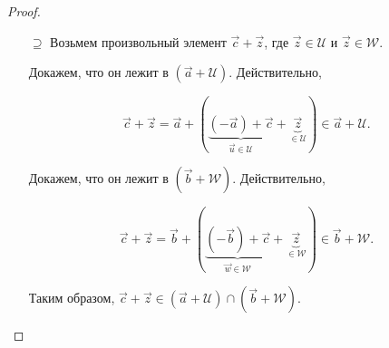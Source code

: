 \begin{proof}
\begin{enumerate}
        \item[$\supseteq$] Возьмем произвольный элемент $\vec{c} + \vec{z}$, где $\vec{z} \in \mathcal{U}$ и $\vec{z} \in \mathcal{W}$.

        Докажем, что он лежит в $(\vec{a} + \mathcal{U})$. Действительно, 
    
        $$\vec{c} + \vec{z} = \vec{a} + (\underbrace{(-\vec{a}) + \vec{c}}_{\vec{u} \in \mathcal{U}} + \underbrace{\vec{z}}_{\in \mathcal{U}}) \in \vec{a} + \mathcal{U.}$$
    
        Докажем, что он лежит в $(\vec{b} + \mathcal{W})$. Действительно, 
    
        $$\vec{c} + \vec{z} = \vec{b} + (\underbrace{(-\vec{b}) + \vec{c}}_{\vec{w} \in \mathcal{W}} + \underbrace{\vec{z}}_{\in \mathcal{W}}) \in \vec{b} + \mathcal{W.}$$
    
        Таким образом, $\vec{c} + \vec{z} \in (\vec{a} + \mathcal{U}) \cap (\vec{b} + \mathcal{W})$.
    \end{enumerate}
\end{proof}
